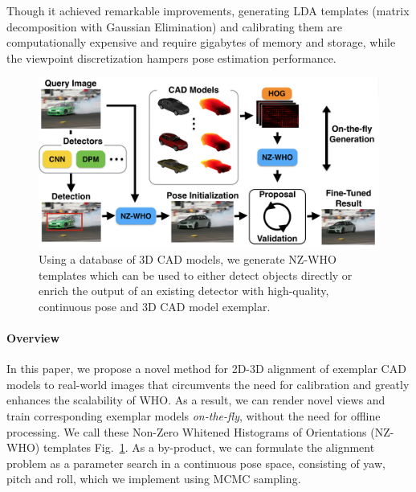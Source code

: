 \documentclass[extendedabs]{bmvc2k}
\begin{document}
Though it achieved remarkable improvements, generating LDA templates (matrix
decomposition with Gaussian Elimination) and calibrating them are
computationally expensive and require gigabytes of memory and storage, while
the viewpoint discretization hampers pose estimation performance.



\begin{figure}[t]
  \centering
  \includegraphics[width=0.8\linewidth]{front} %
  \caption{Using a database of 3D CAD models, we generate NZ-WHO
    templates which can be used to either detect objects directly or
    enrich the output of an existing detector with high-quality,
    continuous pose and 3D CAD model exemplar.}
  \label{fig:front}
\end{figure}


\paragraph{Overview}

In this paper, we propose a novel method for 2D-3D alignment of exemplar CAD
models to real-world images that circumvents the need for calibration and
greatly enhances the scalability of WHO. As a result, we can render novel views
and train corresponding exemplar models {\em on-the-fly}, without the need for
offline processing. We call these Non-Zero Whitened Histograms of Orientations
(NZ-WHO) templates Fig.~\ref{fig:front}. As a by-product, we can formulate the
alignment problem as a parameter search in a continuous pose space, consisting
of yaw, pitch and roll, which we implement using MCMC sampling.
\end{document}
